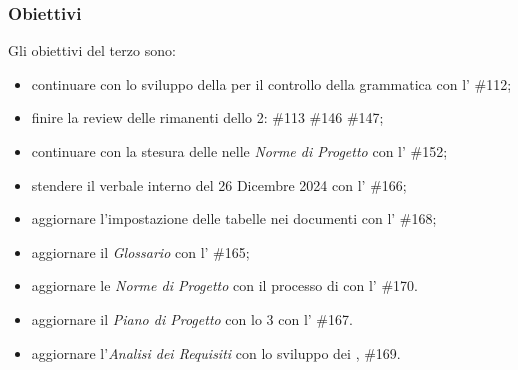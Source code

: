 \subsubsection{Obiettivi}
Gli obiettivi del terzo  sono:
\begin{itemize}
    \item continuare con lo sviluppo della  per il controllo della grammatica con l' \#112;
    \item finire la review delle  rimanenti dello  2: \#113 \#146 \#147;
    \item continuare con la stesura delle  nelle \textit{Norme di Progetto} con l' \#152;
    \item stendere il verbale interno del 26 Dicembre 2024 con l' \#166;
    \item aggiornare l'impostazione delle tabelle nei documenti con l' \#168;
    \item aggiornare il \textit{Glossario} con l' \#165;
    \item aggiornare le \textit{Norme di Progetto} con il processo di  con l' \#170.
    \item aggiornare il \textit{Piano di Progetto} con lo  3 con l' \#167.
    \item aggiornare l'\textit{Analisi dei Requisiti} con lo sviluppo dei ,  \#169.
\end{itemize}